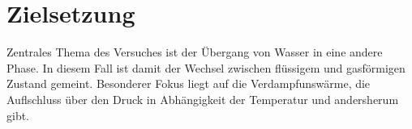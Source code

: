\section{Zielsetzung}

Zentrales Thema des Versuches ist der Übergang von Wasser in eine andere Phase.
In diesem Fall ist damit der Wechsel zwischen flüssigem und gasförmigen Zustand gemeint.
Besonderer Fokus liegt auf die Verdampfunswärme, die Auflschluss über den Druck in Abhängigkeit
der Temperatur und andersherum gibt.